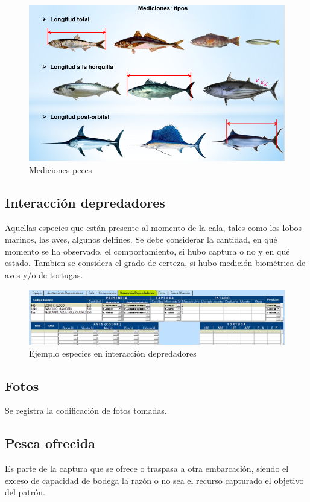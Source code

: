\documentclass[a4paper,oneside,11pt]{book}
\begin{document}
 \begin{figure}
\centering
\includegraphics[width=0.7\linewidth]{./imagen_Manual_PBP/tipomedi}
\caption{Mediciones peces}
\label{fig:tipomedi}
\end{figure}


\subsection{Interacción depredadores}
Aquellas especies que están presente al momento de la cala, tales como los lobos marinos, las aves, algunos delfines. Se debe considerar la cantidad, en qué momento se ha observado,  el comportamiento, si hubo captura o no y en qué estado. Tambien se considera el grado de certeza, si hubo medición biométrica de aves y/o de tortugas.

\begin{figure}
\centering
\includegraphics[width=1\linewidth]{./imagen_Manual_PBP/inter}
\caption{Ejemplo especies en interacción depredadores}
\label{fig:inter}
\end{figure}


\subsection{Fotos} Se registra la codificación de fotos tomadas.

\subsection{Pesca ofrecida} Es parte de la captura que se ofrece o traspasa a otra embarcación, siendo el exceso de capacidad de bodega la razón o no sea el recurso capturado el objetivo del patrón.\\
\end{document}
